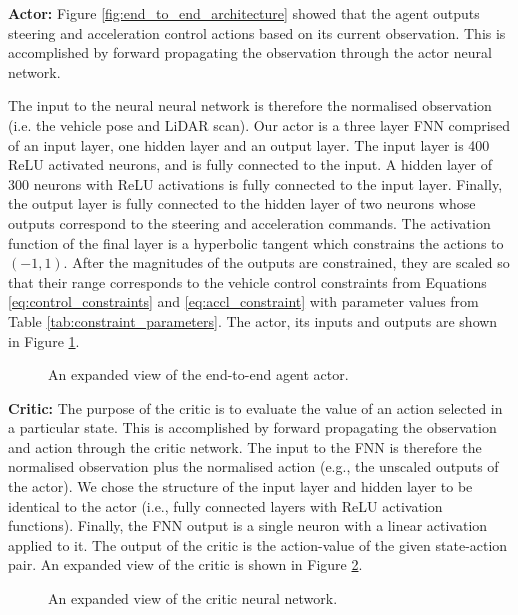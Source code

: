\textbf{Actor:}
Figure \ref{fig:end_to_end_architecture} showed that the agent outputs steering and acceleration control actions based on its current observation.
This is accomplished by forward propagating the observation through the actor neural network.

The input to the neural neural network is therefore the normalised observation (i.e. the vehicle pose and LiDAR scan).
Our actor is a three layer FNN comprised of an input layer, one hidden layer and an output layer.
The input layer is 400 ReLU activated neurons, and is fully connected to the input.
A hidden layer of 300 neurons with ReLU activations is fully connected to the input layer.
Finally, the output layer is fully connected to the hidden layer of two neurons whose outputs correspond to the steering and acceleration commands.
The activation function of the final layer is a hyperbolic tangent which constrains the actions to $(-1,1)$.
After the magnitudes of the outputs are constrained, they are scaled so that their range corresponds to the vehicle control constraints from Equations \ref{eq:control_constraints} and \ref{eq:accl_constraint} with parameter values from Table \ref{tab:constraint_parameters}.
The actor, its inputs and outputs are shown in Figure \ref{fig:actor_architecture}.  

\begin{figure}[htb!]
    \centering
    
    \caption[An expanded view of the end-to-end agent actor]{An expanded view of the end-to-end agent actor.}
    \label{fig:actor_architecture}
\end{figure}


\textbf{Critic:}
The purpose of the critic is to evaluate the value of an action selected in a particular state.
This is accomplished by forward propagating the observation and action through the critic network.
The input to the FNN is therefore the normalised observation plus the normalised action (e.g., the unscaled outputs of the actor).
We chose the structure of the input layer and hidden layer to be identical to the actor (i.e., fully connected layers with ReLU activation functions).
Finally, the FNN output is a single neuron with a linear activation applied to it.
The output of the critic is the action-value of the given state-action pair.
An expanded view of the critic is shown in Figure \ref{fig:critic_architecture}.

\begin{figure}[htb!]
    \centering
    
    \caption[An expanded view of the critic neural network]{An expanded view of the critic neural network.}
    \label{fig:critic_architecture}
\end{figure}

